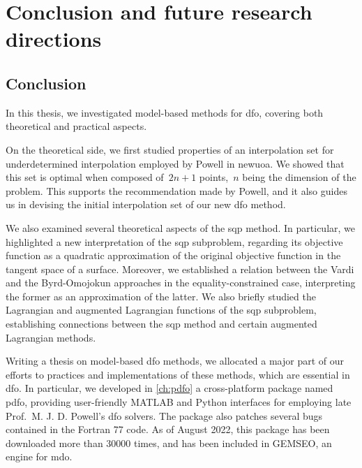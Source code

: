 %
%
%
\chapter{Conclusion and future research directions}
\label{ch:conclusion}

\section{Conclusion}

In this thesis, we investigated model-based methods for \gls{dfo}, covering both theoretical and practical aspects.

On the theoretical side, we first studied properties of an interpolation set for underdetermined interpolation employed by Powell in \gls{newuoa}.
We showed that this set is optimal when composed of~$2n + 1$ points,~$n$ being the dimension of the problem.
This supports the recommendation made by Powell, and it also guides us in devising the initial interpolation set of our new \gls{dfo} method.

We also examined several theoretical aspects of the \gls{sqp} method.
In particular, we highlighted a new interpretation of the \gls{sqp} subproblem, regarding its objective function as a quadratic approximation of the original objective function in the tangent space of a surface.
Moreover, we established a relation between the Vardi and the Byrd-Omojokun approaches in the equality-constrained case, interpreting the former as an approximation of the latter.
We also briefly studied the Lagrangian and augmented Lagrangian functions of the \gls{sqp} subproblem, establishing connections between the \gls{sqp} method and certain augmented Lagrangian methods.

Writing a thesis on model-based \gls{dfo} methods, we allocated a major part of our efforts to practices and implementations of these methods, which are essential in \gls{dfo}.
In particular, we developed in \cref{ch:pdfo} a cross-platform package named \gls{pdfo}, providing user-friendly MATLAB and Python interfaces for employing late Prof.\ M. J. D. Powell's \gls{dfo} solvers.
The package also patches several bugs contained in the Fortran 77 code.
As of August 2022, this package has been downloaded more than \num{30000} times, and has been included in GEMSEO, an engine for \gls{mdo}.

